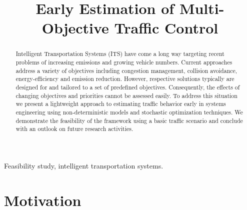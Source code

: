 \documentclass[conference]{../cls/IEEEtran}
\begin{document}
\title{Early Estimation of Multi-Objective Traffic Control}

\author{
	\and
}

\maketitle

\begin{abstract}
Intelligent Transportation Systems (ITS) have come a long way targeting recent problems of increasing emissions and growing vehicle numbers. Current approaches address a variety of objectives including congestion management, collision avoidance, energy-efficiency and emission reduction. However, respective solutions typically are designed for and tailored to a set of predefined objectives. Consequently, the effects of changing objectives and priorities cannot be assessed easily. To address this situation we present a lightweight approach to estimating traffic behavior early in systems engineering using non-deterministic models and stochastic optimization techniques. We demonstrate the feasibility of the framework using a basic traffic scenario and conclude with an outlook on future research activities.
\end{abstract}

\begin{IEEEkeywords}
Feasibility study, intelligent transportation systems.
\end{IEEEkeywords}

\section{Motivation}
\label{sec:motivation}
\end{document}
